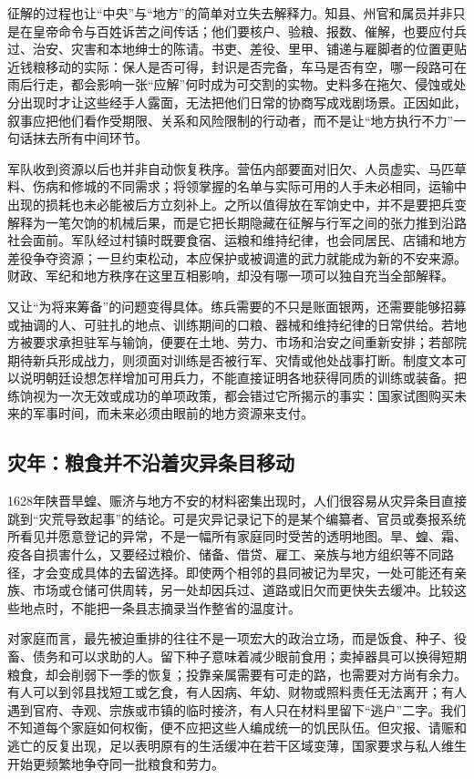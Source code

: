 征解的过程也让“中央”与“地方”的简单对立失去解释力。知县、州官和属员并非只是在皇帝命令与百姓诉苦之间传话；他们要核户、验粮、报数、催解，也要应付兵过、治安、灾害和本地绅士的陈请。书吏、差役、里甲、铺递与雇脚者的位置更贴近钱粮移动的实际：保人是否可得，封识是否完备，车马是否有空，哪一段路可在雨后行走，都会影响一张“应解”何时成为可交割的实物。史料多在拖欠、侵蚀或处分出现时才让这些经手人露面，无法把他们日常的协商写成戏剧场景。正因如此，叙事应把他们看作受期限、关系和风险限制的行动者，而不是让“地方执行不力”一句话抹去所有中间环节。

军队收到资源以后也并非自动恢复秩序。营伍内部要面对旧欠、人员虚实、马匹草料、伤病和修城的不同需求；将领掌握的名单与实际可用的人手未必相同，运输中出现的损耗也未必能被后方立刻补上。之所以值得放在军饷史中，并不是要把兵变解释为一笔欠饷的机械后果，而是它把长期隐藏在征解与行军之间的张力推到沿路社会面前。军队经过村镇时既要食宿、运粮和维持纪律，也会同居民、店铺和地方差役争夺资源；一旦约束松动，本应保护或被调遣的武力就能成为新的不安来源。财政、军纪和地方秩序在这里互相影响，却没有哪一项可以独自充当全部解释。

又让“为将来筹备”的问题变得具体。练兵需要的不只是账面银两，还需要能够招募或抽调的人、可驻扎的地点、训练期间的口粮、器械和维持纪律的日常供给。若地方被要求承担驻军与输饷，便要在土地、劳力、市场和治安之间重新安排；若部院期待新兵形成战力，则须面对训练是否被行军、灾情或他处战事打断。制度文本可以说明朝廷设想怎样增加可用兵力，不能直接证明各地获得同质的训练或装备。把练饷视为一次无效或成功的单项政策，都会错过它所揭示的事实：国家试图购买未来的军事时间，而未来必须由眼前的地方资源来支付。

\subsection{灾年：粮食并不沿着灾异条目移动}

1628年陕晋旱蝗、赈济与地方不安的材料密集出现时，人们很容易从灾异条目直接跳到“灾荒导致起事”的结论。可是灾异记录记下的是某个编纂者、官员或奏报系统所看见并愿意登记的异常，不是一幅所有家庭同时受苦的透明地图。旱、蝗、霜、疫各自损害什么，又要经过粮价、储备、借贷、雇工、亲族与地方组织等不同路径，才会变成具体的去留选择。即使两个相邻的县同被记为旱灾，一处可能还有亲族、市场或仓储可供周转，另一处却因兵过、道路或旧欠而更快失去缓冲。比较这些地点时，不能把一条县志摘录当作整省的温度计。

对家庭而言，最先被迫重排的往往不是一项宏大的政治立场，而是饭食、种子、役畜、债务和可以求助的人。留下种子意味着减少眼前食用；卖掉器具可以换得短期粮食，却会削弱下一季的恢复；投靠亲属需要有可走的路，也需要对方尚有余力。有人可以到邻县找短工或乞食，有人因病、年幼、财物或照料责任无法离开；有人遇到官府、寺观、宗族或市镇的临时接济，有人只在材料里留下“逃户”二字。我们不知道每个家庭如何权衡，便不应把这些人编成统一的饥民队伍。但灾报、请赈和逃亡的反复出现，足以表明原有的生活缓冲在若干区域变薄，国家要求与私人维生开始更频繁地争夺同一批粮食和劳力。

